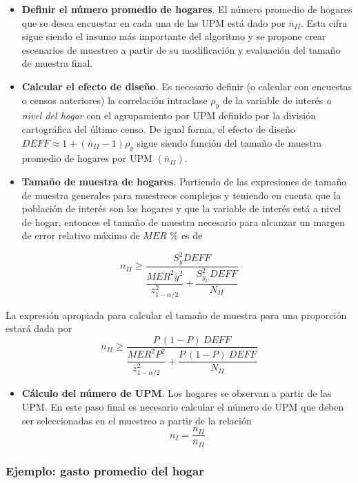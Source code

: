 \documentclass[
  12pt,
  spanish,
]{book}
\providecommand{\tightlist}{%
  \setlength{\itemsep}{0pt}\setlength{\parskip}{0pt}}
\begin{document}
\begin{itemize}
\item
  \textbf{Definir el número promedio de hogares}. El número promedio de hogares que se desea encuestar en cada una de las UPM está dado por \(\bar{n}_{II}\). Esta cifra sigue siendo el insumo más importante del algoritmo y se propone crear escenarios de muestreo a partir de su modificación y evaluación del tamaño de muestra final.
\item
  \textbf{Calcular el efecto de diseño}. Es necesario definir (o calcular con encuestas o censos anteriores) la correlación intraclase \(\rho_y\) de la variable de interés \emph{a nivel del hogar} con el agrupamiento por UPM definido por la división cartográfica del último censo. De igual forma, el efecto de diseño \(DEFF \approx 1 + (\bar{n}_{II} - 1)\rho_y\) sigue siendo función del tamaño de muestra promedio de hogares por UPM \((\bar{n}_{II})\).
\item
  \textbf{Tamaño de muestra de hogares}. Partiendo de las expresiones de tamaño de muestra generales para muestreos complejos y teniendo en cuenta que la población de interés son los hogares y que la variable de interés está a nivel de hogar, entonces el tamaño de muestra necesario para alcanzar un margen de error relativo máximo de \(MER\) \% es de
\end{itemize}

\[
n_{II} \geq \dfrac{S^2_{y}DEFF}{\dfrac{MER^2 \bar{y}^2}{z_{1-\alpha/2}^2}+\dfrac{S^2_{y_U}DEFF}{N_{II}}}
\]

La expresión apropiada para calcular el tamaño de muestra para una proporción estará dada por
\[
n_{II} \geq \dfrac{P\ (1-P)\ DEFF}{\dfrac{MER^2P^2}{z_{1-\alpha/2}^2}+\dfrac{P\ (1-P) \ DEFF}{N_{II}}}
\]

\begin{itemize}
\tightlist
\item
  \textbf{Cálculo del número de UPM}. Los hogares se observan a partir de las UPM. En este paso final es necesario calcular el número de UPM que deben ser seleccionadas en el muestreo a partir de la relación
  \[
  n_{I} = \frac{n_{II}}{\bar{n}_{II}}
  \]
\end{itemize}

\hypertarget{ejemplo-gasto-promedio-del-hogar}{%
\subsubsection*{Ejemplo: gasto promedio del hogar}\label{ejemplo-gasto-promedio-del-hogar}}
\end{document}
